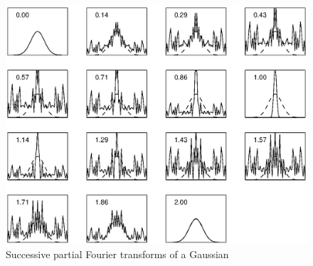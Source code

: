 \begin{exo}
\begin{figure}[ht]
    \begin{center}
    \includegraphics [scale = 0.5]{images/transformee-fourier-partielle.eps}
    \end{center}
    \caption{Successive partial Fourier transforms of a Gaussian}
              \label{fig-transforme-partial-fourier}
\end{figure}
\end{exo}
 
